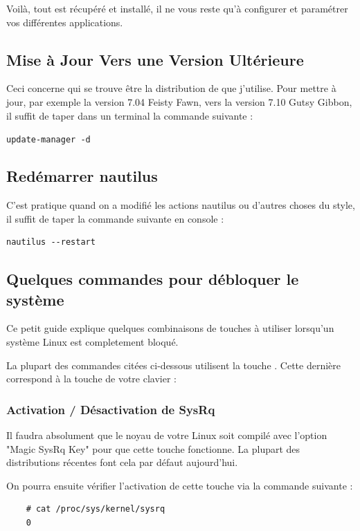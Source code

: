 \documentclass[a4paper,twoside]{article}
\begin{document}
Voilà, tout est récupéré et installé, il ne vous reste qu'à configurer et paramétrer vos différentes applications.

\subsection{Mise à Jour Vers une Version Ultérieure}
Ceci concerne  qui se trouve être la distribution de  que j'utilise. Pour mettre à jour, par exemple la version 7.04 Feisty Fawn, vers la version 7.10 Gutsy Gibbon, il suffit de taper dans un terminal la commande suivante :

\verb|update-manager -d|

\subsection{Redémarrer nautilus}
C'est pratique quand on a modifié les actions nautilus ou d'autres choses du style, il suffit de taper la commande suivante en console :

\begin{verbatim}
nautilus --restart
\end{verbatim}

\subsection{Quelques commandes pour débloquer le système}
Ce petit guide explique quelques combinaisons de touches à utiliser lorsqu'un système Linux est completement bloqué.


La plupart des commandes citées ci-dessous utilisent la touche . Cette dernière correspond à la touche  de votre clavier :

\subsubsection{Activation / Désactivation de SysRq}

Il faudra absolument que le noyau de votre Linux soit compilé avec l'option "Magic SysRq Key" pour que cette touche fonctionne. La plupart des distributions récentes font cela par défaut aujourd'hui.

On pourra ensuite vérifier l'activation de cette touche via la commande suivante :
\begin{verbatim}
    # cat /proc/sys/kernel/sysrq
    0
\end{verbatim}
\end{document}
